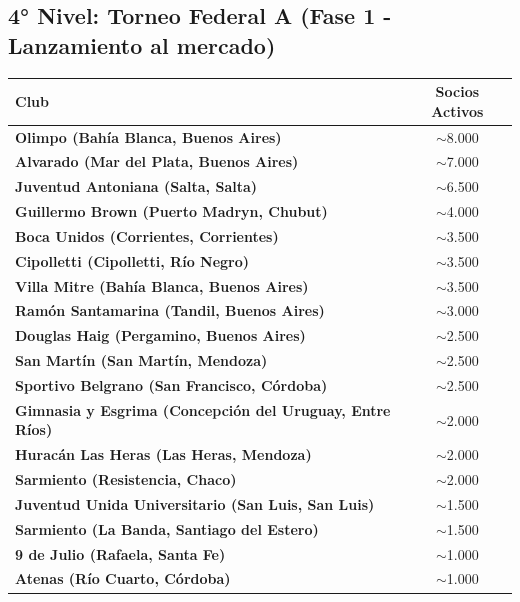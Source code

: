 \newpage

\subsection{4° Nivel: Torneo Federal A (Fase 1 - Lanzamiento al mercado)}

\begin{table}[h!]
\centering
\renewcommand{\arraystretch}{1.1}
\begin{tabularx}{\textwidth}{|X|c|}
\hline
\rowcolor{gray!20} \textbf{Club} & \textbf{Socios Activos} \\ \hline
\textbf{Olimpo (Bahía Blanca, Buenos Aires)} & $\sim$8.000 \\ \hline
\textbf{Alvarado (Mar del Plata, Buenos Aires)} & $\sim$7.000 \\ \hline
\textbf{Juventud Antoniana (Salta, Salta)} & $\sim$6.500 \\ \hline
\textbf{Guillermo Brown (Puerto Madryn, Chubut)} & $\sim$4.000 \\ \hline
\textbf{Boca Unidos (Corrientes, Corrientes)} & $\sim$3.500 \\ \hline
\textbf{Cipolletti (Cipolletti, Río Negro)} & $\sim$3.500 \\ \hline
\textbf{Villa Mitre (Bahía Blanca, Buenos Aires)} & $\sim$3.500 \\ \hline
\textbf{Ramón Santamarina (Tandil, Buenos Aires)} & $\sim$3.000 \\ \hline
\textbf{Douglas Haig (Pergamino, Buenos Aires)} & $\sim$2.500 \\ \hline
\textbf{San Martín (San Martín, Mendoza)} & $\sim$2.500 \\ \hline
\textbf{Sportivo Belgrano (San Francisco, Córdoba)} & $\sim$2.500 \\ \hline
\textbf{Gimnasia y Esgrima (Concepción del Uruguay, Entre Ríos)} & $\sim$2.000 \\ \hline
\textbf{Huracán Las Heras (Las Heras, Mendoza)} & $\sim$2.000 \\ \hline
\textbf{Sarmiento (Resistencia, Chaco)} & $\sim$2.000 \\ \hline
\textbf{Juventud Unida Universitario (San Luis, San Luis)} & $\sim$1.500 \\ \hline
\textbf{Sarmiento (La Banda, Santiago del Estero)} & $\sim$1.500 \\ \hline
\textbf{9 de Julio (Rafaela, Santa Fe)} & $\sim$1.000 \\ \hline
\textbf{Atenas (Río Cuarto, Córdoba)} & $\sim$1.000 \\ \hline

\end{tabularx}
\end{table}
